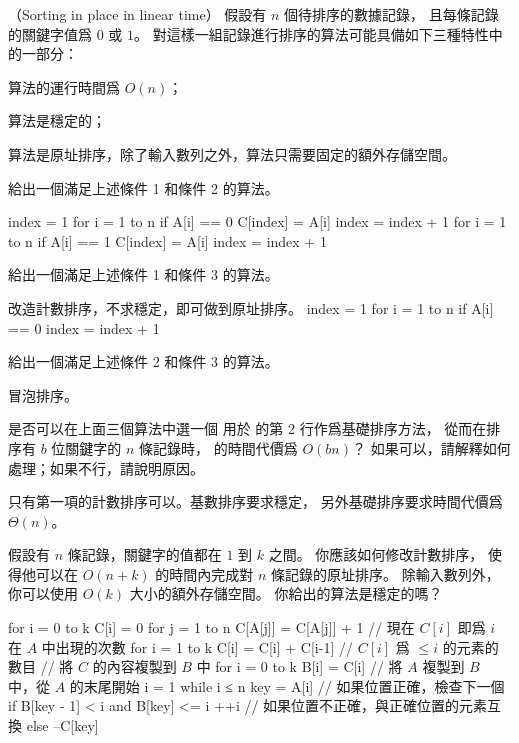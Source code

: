 \startPROBLEM
（Sorting in place in linear time）
假設有 $n$ 個待排序的數據記錄，
且每條記錄的關鍵字值爲 $0$ 或 $1$。
對這樣一組記錄進行排序的算法可能具備如下三種特性中的一部分：
\startigBase[n]
\item 算法的運行時間爲 $O(n)$；
\item 算法是穩定的；
\item 算法是原址排序，除了輸入數列之外，算法只需要固定的額外存儲空間。
\stopigBase

\startigBase[a]\startitem
給出一個滿足上述條件 1 和條件 2 的算法。
\stopitem\stopigBase

\startANSWER
\startCLRSCODE
{}
index = 1
for i = 1 to n
	if A[i] == 0
		C[index] = A[i]
		index = index + 1
for i = 1 to n
	if A[i] == 1
		C[index] = A[i]
		index = index + 1
\stopCLRSCODE
\stopANSWER

\startigBase[a,continue]\startitem
給出一個滿足上述條件 1 和條件 3 的算法。
\stopitem\stopigBase

\startANSWER
改造計數排序，不求穩定，即可做到原址排序。
\startCLRSCODE
index = 1
for i = 1 to n
	if A[i] == 0
		index = index + 1
\stopCLRSCODE
\stopANSWER

\startigBase[a,continue]\startitem
給出一個滿足上述條件 2 和條件 3 的算法。
\stopitem\stopigBase

\startANSWER
冒泡排序。
\stopANSWER

\startigBase[a,continue]\startitem
是否可以在上面三個算法中選一個
用於  的第 2 行作爲基礎排序方法，
從而在排序有 $b$ 位關鍵字的 $n$ 條記錄時，
  的時間代價爲 $O(bn)$？
如果可以，請解釋如何處理；如果不行，請說明原因。
\stopitem\stopigBase

\startANSWER
只有第一項的計數排序可以。基數排序要求穩定，
另外基礎排序要求時間代價爲 $\Theta(n)$。
\stopANSWER

\startigBase[a,continue]\startitem
假設有 $n$ 條記錄，關鍵字的值都在 $1$ 到 $k$ 之間。
你應該如何修改計數排序，
使得他可以在 $O(n+k)$ 的時間內完成對 $n$ 條記錄的原址排序。
除輸入數列外，
你可以使用 $O(k)$ 大小的額外存儲空間。
你給出的算法是穩定的嗎？
\stopitem\stopigBase

\startANSWER
\startCLRSCODE
{}
for i = 0 to k
	C[i] = 0
for j = 1 to n
	C[A[j]] = C[A[j]] + 1
// 現在 $C[i]$ 即爲 $i$ 在 $A$ 中出現的次數
for i = 1 to k
	C[i] = C[i] + C[i-1]
// $C[i]$ 爲 $\le i$ 的元素的數目
// 將 $C$ 的內容複製到 $B$ 中
for i = 0 to k
	B[i] = C[i]
// 將 $A$ 複製到 $B$ 中，從 $A$ 的末尾開始
i = 1
while i ≤ n
	key = A[i]
	// 如果位置正確，檢查下一個
	if B[key - 1] < i and B[key] <= i
		++i
	// 如果位置不正確，與正確位置的元素互換
	else
		--C[key]
\stopCLRSCODE
\stopANSWER

\stopPROBLEM
